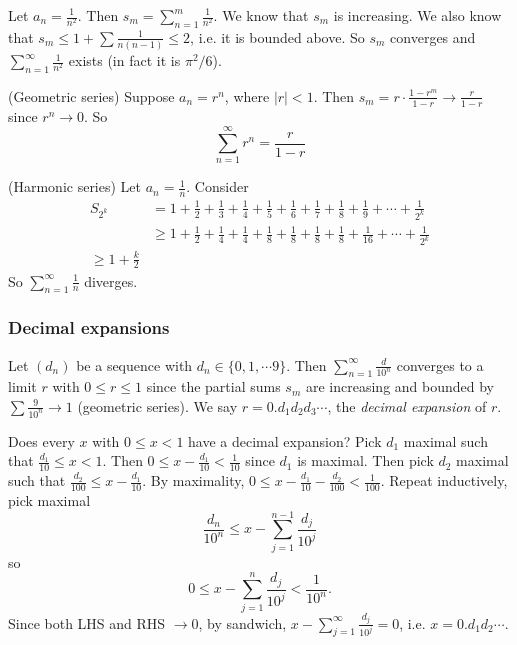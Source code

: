\documentclass[a4paper]{article}
\begin{document}
  \begin{eg}
    Let $a_n = \frac{1}{n^2}$. Then $s_m = \sum_{n = 1}^{m} \frac{1}{n^2}$. We know that $s_m$ is increasing. We also know that $s_m \leq 1 + \sum \frac{1}{n(n -1)} \leq 2$, i.e. it is bounded above. So $s_m$ converges and $\sum_{n = 1}^{\infty} \frac{1}{n^2}$ exists (in fact it is $\pi^2/6$).
  \end{eg}

  \begin{eg}
    (Geometric series) Suppose $a_n = r^n$, where $|r| < 1$. Then $s_m = r\cdot \frac{1 - r^m}{1 - r} \to \frac{r}{1- r}$ since $r^n \to 0$. So
    \[
      \sum_{n = 1}^\infty r^n = \frac{r}{1 - r}
    \]
  \end{eg}

  \begin{eg}
    (Harmonic series) Let $a_n = \frac{1}{n}$. Consider
    \begin{align*}
      S_{2^k} &= 1 + \frac{1}{2} + \frac{1}{3} + \frac{1}{4} + \frac{1}{5} + \frac{1}{6} + \frac{1}{7} + \frac{1}{8} + \frac{1}{9} + \cdots + \frac{1}{2^k}\\
      & \geq 1 + \frac{1}{2} + \frac{1}{4} + \frac{1}{4} + \frac{1}{8} + \frac{1}{8} + \frac{1}{8} + \frac{1}{8} + \frac{1}{16} + \cdots + \frac{1}{2^k}\\
      \geq 1 + \frac{k}{2}
    \end{align*}
    So $\displaystyle \sum_{n = 1}^\infty\frac{1}{n}$ diverges.
  \end{eg}

  \subsubsection{Decimal expansions}
  \begin{defi}
    Let $(d_n)$ be a sequence with $d_n\in \{0, 1, \cdots 9\}$. Then $\displaystyle \sum_{n = 1}^\infty \frac{d}{10^n}$ converges to a limit $r$ with $0 \leq r \leq 1$ since the partial sums $s_m$ are increasing and bounded by $\sum \frac{9}{10^n}\to 1$ (geometric series). We say $r = 0.d_1d_2d_3\cdots$, the \emph{decimal expansion} of $r$.
  \end{defi}

  Does every $x$ with $0 \leq x < 1$ have a decimal expansion?
  Pick $d_1$ maximal such that $\frac{d_1}{10} \leq x < 1$. Then $0 \leq x - \frac{d_1}{10} < \frac{1}{10}$ since $d_1$ is maximal. Then pick $d_2$ maximal such that $\frac{d_2}{100} \leq x - \frac{d_1}{10}$. By maximality, $0 \leq x - \frac{d_1}{10} - \frac{d_2}{100}  < \frac{1}{100}$. Repeat inductively, pick maximal 
  \[
    \frac{d_n}{10^n} \leq x- \sum_{j = 1}^{n - 1} \frac{d_j}{10^j}
  \]
  so
  \[
    0 \leq x - \sum_{j = 1}^n \frac{d_j}{10^j} < \frac{1}{10^n}.
  \]
  Since both LHS and RHS $\to 0$, by sandwich, $x - \sum_{j = 1}^\infty \frac{d_j}{10^j} = 0$, i.e. $x = 0.d_1d_2\cdots$.
\end{document}
